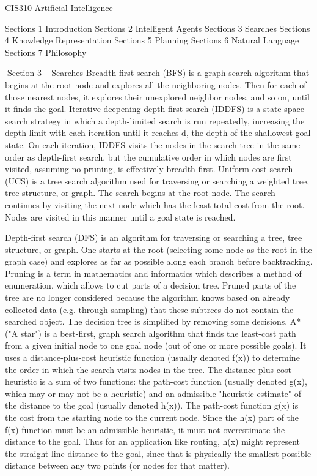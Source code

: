 CIS310 Artificial Intelligence

Sections 1 Introduction
Sections 2 Intelligent Agents
Sections 3 Searches
Sections 4 Knowledge Representation
Sections 5 Planning
Sections 6 Natural Language
Sections 7 Philosophy

Section 3 – Searches
Breadth-first search (BFS) is a graph search algorithm that begins at the root node and explores all the neighboring nodes. Then for each of those nearest nodes, it explores their unexplored neighbor nodes, and so on, until it finds the goal. 
Iterative deepening depth-first search (IDDFS) is a state space search strategy in which a depth-limited search is run repeatedly, increasing the depth limit with each iteration until it reaches d, the depth of the shallowest goal state. On each iteration, IDDFS visits the nodes in the search tree in the same order as depth-first search, but the cumulative order in which nodes are first visited, assuming no pruning, is effectively breadth-first.
Uniform-cost search (UCS) is a tree search algorithm used for traversing or searching a weighted tree, tree structure, or graph. The search begins at the root node. The search continues by visiting the next node which has the least total cost from the root. Nodes are visited in this manner until a goal state is reached.

Depth-first search (DFS) is an algorithm for traversing or searching a tree, tree structure, or graph. One starts at the root (selecting some node as the root in the graph case) and explores as far as possible along each branch before backtracking.
Pruning is a term in mathematics and informatics which describes a method of enumeration, which allows to cut parts of a decision tree. Pruned parts of the tree are no longer considered because the algorithm knows based on already collected data (e.g. through sampling) that these subtrees do not contain the searched object. The decision tree is simplified by removing some decisions.
A* ("A star") is a best-first, graph search algorithm that finds the least-cost path from a given initial node to one goal node (out of one or more possible goals).
It uses a distance-plus-cost heuristic function (usually denoted f(x)) to determine the order in which the search visits nodes in the tree. The distance-plus-cost heuristic is a sum of two functions: the path-cost function (usually denoted g(x), which may or may not be a heuristic) and an admissible "heuristic estimate" of the distance to the goal (usually denoted h(x)). The path-cost function g(x) is the cost from the starting node to the current node.
Since the h(x) part of the f(x) function must be an admissible heuristic, it must not overestimate the distance to the goal. Thus for an application like routing, h(x) might represent the straight-line distance to the goal, since that is physically the smallest possible distance between any two points (or nodes for that matter).


